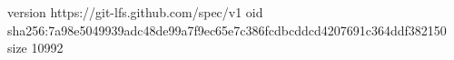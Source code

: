 version https://git-lfs.github.com/spec/v1
oid sha256:7a98e5049939adc48de99a7f9ec65e7c386fcdbcddcd4207691c364ddf382150
size 10992
